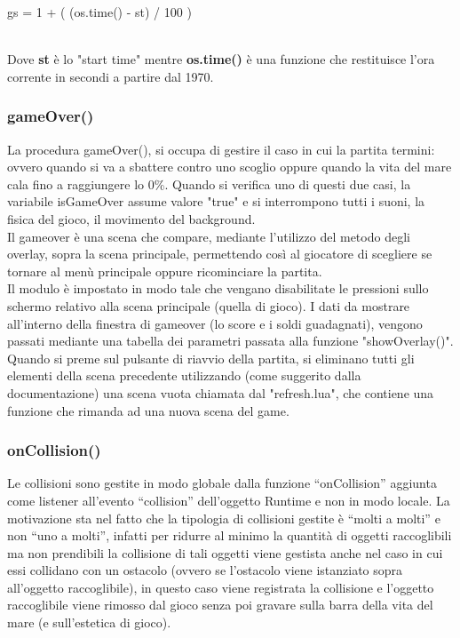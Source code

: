 \documentclass[15pt]{article}
\begin{document}
\begin{center}
    gs = 1 + ( (os.time() - st) / 100 )
\end{center}

\\

Dove \textbf{st} è lo "start time" mentre \textbf{os.time()} è una funzione che restituisce l'ora corrente in secondi a partire dal 1970.

\subsubsection{gameOver()}
La procedura gameOver(), si occupa di gestire il caso in cui la partita termini: ovvero quando si va a sbattere contro uno scoglio oppure quando la vita del mare cala fino a raggiungere lo 0\%. Quando si verifica uno di questi due casi, la variabile isGameOver assume valore "true" e si interrompono tutti i suoni, la fisica del gioco, il movimento del background.\\

Il gameover è una scena che compare, mediante l'utilizzo del metodo degli overlay, sopra la scena principale, permettendo così al giocatore di scegliere se tornare al menù principale oppure ricominciare la partita.\\ 

Il modulo è impostato in modo tale che vengano disabilitate le pressioni sullo schermo relativo alla scena principale (quella di gioco). I dati da mostrare all'interno della finestra di gameover (lo score e i soldi guadagnati), vengono passati mediante una tabella dei parametri passata alla funzione "showOverlay()".\\

Quando si preme sul pulsante di riavvio della partita, si eliminano tutti gli elementi della scena precedente utilizzando (come suggerito dalla documentazione) una scena vuota chiamata dal  "refresh.lua", che contiene una funzione che rimanda ad una nuova scena del game.
\subsubsection{onCollision()}
Le collisioni sono gestite in modo globale dalla funzione “onCollision” aggiunta come
listener all’evento “collision” dell’oggetto Runtime e non in modo locale.
La motivazione sta nel fatto che la tipologia di collisioni gestite è “molti a molti” e non
“uno a molti”, infatti per ridurre al minimo la quantità di oggetti raccoglibili ma non
prendibili la collisione di tali oggetti viene gestista anche nel caso in cui essi collidano con un
ostacolo (ovvero se l’ostacolo viene istanziato sopra all’oggetto raccoglibile), in questo
caso viene registrata la collisione e l’oggetto raccoglibile viene rimosso dal gioco senza
poi gravare sulla barra della vita del mare (e sull’estetica di gioco).\\
\end{document}
